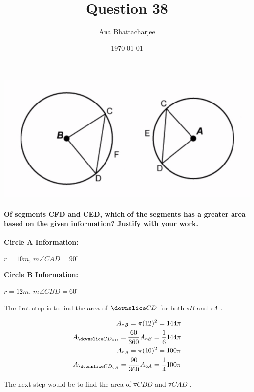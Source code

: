 \documentclass{article}
\begin{document}
\title{Question 38}
\author{Ana Bhattacharjee}
\date{\today}
\maketitle{}


\includegraphics[width=0.9\columnwidth]{q38.png}
\paragraph{Of segments CFD and CED, which of the segments has a greater area based on the given information? Justify with your work.}
\par

\textbf{Circle A Information: }
\par
$ r = 10 m $, $ m\angle{CAD} = 90^\circ$
\par
\textbf{Circle B Information: }
\par
$ r = 12 m $, $ m\angle{CBD} = 60^\circ$

The first step is to find the area of $ \downslice CD $ for both $ \circ B $ and $ \circ A $ .

\begin{align}
  A_{\circ B} = \pi (12)^2 = 144 \pi \\
  A_{\downslice CD_{\circ B}} = \frac{60}{360} A_{\circ B} = \frac{1}{6} 144 \pi \\
  A_{\circ A} = \pi (10)^2 = 100 \pi \\
  A_{\downslice CD_{\circ A}} = \frac{90}{360} A_{\circ A} = \frac{1}{4} 100 \pi
\end{align}

\par

The next step would be to find the area of $ \triangledown{CBD} $ and $ \triangledown{CAD} $ .
\end{document}
